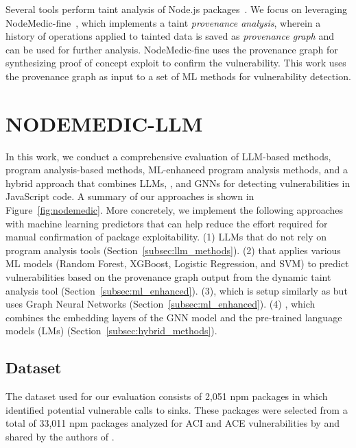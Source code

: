 \documentclass[12pt,openany,oneside,table]{cmuthesis}
\begin{document}
Several tools perform taint analysis of Node.js packages~\cite{karim-PlatformIndependent,nielsen-Nodest,gauthier-AFFOGATO,song_ObjLupAnsys,ming_taintpipe,jsprime_2013,staicu-Extracting}. We focus on leveraging NodeMedic-fine~\cite{nodemedic-fine}, which implements a taint \emph{provenance analysis}, wherein a history of operations applied to tainted data is saved as \emph{provenance graph} and can be used for further analysis. NodeMedic-fine uses the provenance graph for synthesizing proof of concept exploit to confirm the vulnerability. This work uses the provenance graph as input to a set of ML methods for vulnerability detection.

\section{NODEMEDIC-LLM}
In this work, we conduct a comprehensive evaluation of LLM-based methods, program analysis-based methods, ML-enhanced program analysis methods, and a hybrid approach that combines LLMs, \nodemedicfine, and GNNs for detecting vulnerabilities in JavaScript code.
A summary of our approaches is shown in Figure~\ref{fig:nodemedic}.
More concretely, we implement the following approaches with machine learning predictors that can help reduce the effort required for manual confirmation of package exploitability. (1) LLMs that do not rely on program analysis tools (Section~\ref{subsec:llm_methods}). (2)  that applies various ML models (Random Forest, XGBoost, Logistic Regression, and SVM) to predict vulnerabilities based on the provenance graph output from the dynamic taint analysis tool \nodemedicfine (Section~\ref{subsec:ml_enhanced}). 
(3), which is setup similarly as  but uses Graph Neural Networks (Section~\ref{subsec:ml_enhanced}). 
(4) , which combines the embedding layers of the GNN model and the pre-trained language models (LMs) (Section~\ref{subsec:hybrid_methods}).


\subsection{Dataset}\label{subsec:datasets}
The dataset used for our evaluation consists of 2,051 npm packages in which \nodemedicfine identified potential vulnerable calls to sinks. These packages were selected from a total of 33,011 npm packages analyzed for ACI and ACE vulnerabilities by \nodemedicfine and shared by the authors of \nodemedicfine.
\end{document}
